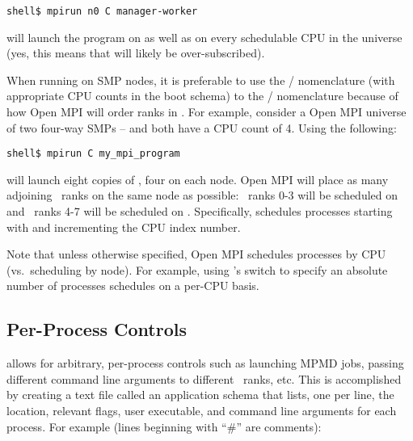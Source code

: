 \lstset{style=lam-cmdline}
\begin{lstlisting}
shell$ mpirun n0 C manager-worker
\end{lstlisting}

\noindent will launch the  program on 
as well as on every schedulable CPU in the universe (yes, this means
that  will likely be over-subscribed).

When running on SMP nodes, it is preferable to use the
/ nomenclature (with appropriate CPU
counts in the boot schema) to the /
nomenclature because of how Open MPI will order ranks in \mcw.  For
example, consider a Open MPI universe of two four-way SMPs -- 
and  both have a CPU count of 4.  Using the following:

\lstset{style=lam-cmdline}
\begin{lstlisting}
shell$ mpirun C my_mpi_program
\end{lstlisting}

\noindent will launch eight copies of , four
on each node.  Open MPI will place as many adjoining \mcw\ ranks on the
same node as possible: \mcw\ ranks 0-3 will be scheduled on
 and \mcw\ ranks 4-7 will be scheduled on .
Specifically,  schedules processes starting with 
and incrementing the CPU index number.

Note that unless otherwise specified, Open MPI schedules processes by CPU
(vs.\ scheduling by node).  For example, using 's
 switch to specify an absolute number of processes
schedules on a per-CPU basis.


\subsection{Per-Process Controls}

 allows for arbitrary, per-process controls such as
launching MPMD jobs, passing different command line arguments to
different \mcw\ ranks, etc.  This is accomplished by creating a text
file called an application schema that lists, one per line, the
location, relevant flags, user executable, and command line arguments
for each process.  For example (lines beginning with ``\#'' are
comments):

